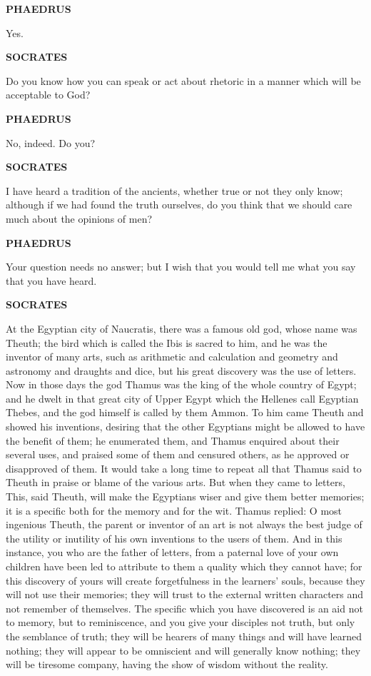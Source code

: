 \documentclass[11pt,letter]{article}
\begin{document}
\par \textbf{PHAEDRUS}
\par   Yes.

\par \textbf{SOCRATES}
\par   Do you know how you can speak or act about rhetoric in a manner which will be acceptable to God?

\par \textbf{PHAEDRUS}
\par   No, indeed. Do you?

\par \textbf{SOCRATES}
\par   I have heard a tradition of the ancients, whether true or not they only know; although if we had found the truth ourselves, do you think that we should care much about the opinions of men?

\par \textbf{PHAEDRUS}
\par   Your question needs no answer; but I wish that you would tell me what you say that you have heard.

\par \textbf{SOCRATES}
\par   At the Egyptian city of Naucratis, there was a famous old god, whose name was Theuth; the bird which is called the Ibis is sacred to him, and he was the inventor of many arts, such as arithmetic and calculation and geometry and astronomy and draughts and dice, but his great discovery was the use of letters. Now in those days the god Thamus was the king of the whole country of Egypt; and he dwelt in that great city of Upper Egypt which the Hellenes call Egyptian Thebes, and the god himself is called by them Ammon. To him came Theuth and showed his inventions, desiring that the other Egyptians might be allowed to have the benefit of them; he enumerated them, and Thamus enquired about their several uses, and praised some of them and censured others, as he approved or disapproved of them. It would take a long time to repeat all that Thamus said to Theuth in praise or blame of the various arts. But when they came to letters, This, said Theuth, will make the Egyptians wiser and give them better memories; it is a specific both for the memory and for the wit. Thamus replied:  O most ingenious Theuth, the parent or inventor of an art is not always the best judge of the utility or inutility of his own inventions to the users of them. And in this instance, you who are the father of letters, from a paternal love of your own children have been led to attribute to them a quality which they cannot have; for this discovery of yours will create forgetfulness in the learners' souls, because they will not use their memories; they will trust to the external written characters and not remember of themselves. The specific which you have discovered is an aid not to memory, but to reminiscence, and you give your disciples not truth, but only the semblance of truth; they will be hearers of many things and will have learned nothing; they will appear to be omniscient and will generally know nothing; they will be tiresome company, having the show of wisdom without the reality.
\end{document}
